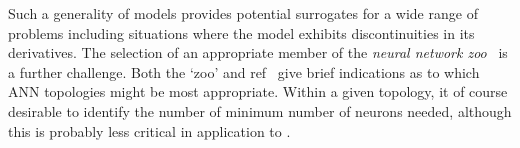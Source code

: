 Such a generality of models provides potential surrogates for a wide range of problems 
including situations where the model exhibits discontinuities in its derivatives.
The selection of an appropriate member of the {\it neural network zoo}~\cite{asimovwebsite} is
a further challenge. Both the `zoo' and ref~\cite[\S\,6.7]{bruntonkutz} give brief indications
as to which ANN topologies might be most appropriate. Within a given topology, it of
course desirable to identify the number of minimum number of neurons needed, although this
is probably less critical in application to \nep.

%
%
%

